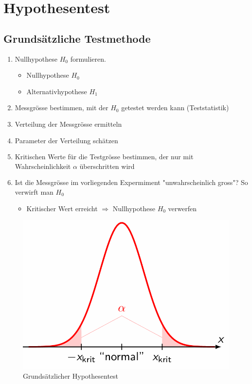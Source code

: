 \documentclass[../Main.tex]{subfiles}
\begin{document}
\section{Hypothesentest}
\subsection{Grundsätzliche Testmethode}
\begin{enumerate}
    \item Nullhypothese \(H_0\) formulieren.
    \begin{itemize}
        \item Nullhypothese \(H_0\)
        \item Alternativhypothese \(H_1\)
    \end{itemize}
    \item Messgrösse bestimmen, mit der \(H_0\) getestet werden kann (Teststatistik)
    \item Verteilung der Messgrösse ermitteln
    \item Parameter der Verteilung schätzen
    \item Kritischen Werte für die Testgrösse bestimmen, der nur mit Wahrscheinlichkeit \(\alpha\) überschritten wird
    \item Ist die Messgrösse im vorliegenden Expermiment "unwahrscheinlich gross"? So verwirft man \(H_0\)
    \begin{itemize}
        \item Kritischer Wert erreicht \(\Rightarrow\) Nullhypothese \(H_0\) verwerfen
    \end{itemize}
\end{enumerate}

\begin{figure}[H]
    \centering
    \includegraphics[width=0.5\linewidth]{Images/hypo-test.png}
    \caption{Grundsätzlicher Hypothesentest}
\end{figure}
\end{document}
